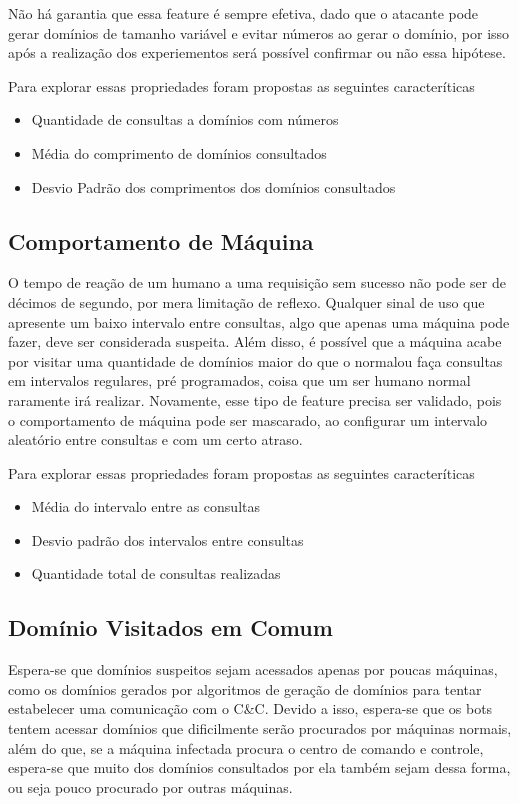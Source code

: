 Não há garantia que essa feature é sempre efetiva, dado que o atacante pode gerar domínios de tamanho variável e evitar números ao gerar o domínio, por isso após a realização dos experiementos será possível confirmar ou não essa hipótese.

Para explorar essas propriedades foram propostas as seguintes caracteríticas

\begin{itemize}
\item Quantidade de consultas a domínios com números 
\item Média do comprimento de domínios consultados
\item Desvio Padrão dos comprimentos dos domínios consultados
\end{itemize}

\subsection{Comportamento de Máquina}

O tempo de reação de um humano a uma requisição sem sucesso não pode ser de décimos de segundo, por mera limitação de reflexo. Qualquer sinal de uso que apresente um baixo intervalo entre consultas, algo que apenas uma máquina pode fazer, deve ser considerada suspeita. Além disso, é possível que a máquina acabe por visitar uma quantidade de domínios maior do que o normalou faça consultas em intervalos regulares, pré programados, coisa que um ser humano normal raramente irá realizar. Novamente, esse tipo de feature precisa ser validado, pois o comportamento de máquina pode ser mascarado, ao configurar um intervalo aleatório entre consultas e com um certo atraso.

Para explorar essas propriedades foram propostas as seguintes caracteríticas

\begin{itemize}
\item Média do intervalo entre as consultas
\item Desvio padrão dos intervalos entre consultas
\item Quantidade total de consultas realizadas
\end{itemize}

\subsection{Domínio Visitados em Comum}
Espera-se que domínios suspeitos sejam acessados apenas por poucas máquinas, como os domínios gerados por algoritmos de geração de domínios para tentar estabelecer uma comunicação com o C\&C. Devido a isso, espera-se que os bots tentem acessar domínios que dificilmente serão procurados por máquinas normais, além do que, se a máquina infectada procura o centro de comando e controle, espera-se que muito dos domínios consultados por ela também sejam dessa forma, ou seja pouco procurado por outras máquinas.

